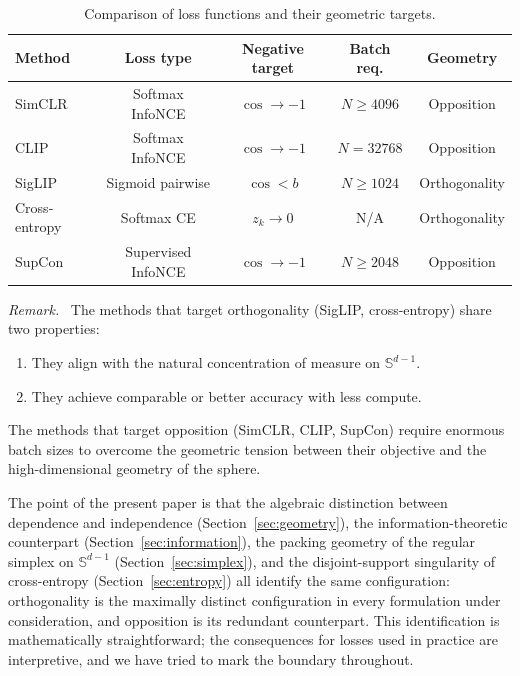 \documentclass[11pt,a4paper]{article}
\theoremstyle{remark}
\newenvironment{keyresult}{\par\medskip\noindent\textit{Remark.}\ }{\par\medskip}
\begin{document}
\begin{table}[ht]
\centering
\caption{Comparison of loss functions and their geometric targets.}
\label{tab:comparison}
\begin{tabular}{@{}lcccc@{}}
\toprule
\textbf{Method} & \textbf{Loss type} & \textbf{Negative target} & \textbf{Batch req.} & \textbf{Geometry} \\
\midrule
SimCLR~\cite{chen2020simclr} & Softmax InfoNCE & $\cos \to -1$ & $N \geq 4096$ & Opposition \\
CLIP~\cite{radford2021clip} & Softmax InfoNCE & $\cos \to -1$ & $N = 32768$ & Opposition \\
SigLIP~\cite{zhai2023siglip} & Sigmoid pairwise & $\cos < b$ & $N \geq 1024$ & Orthogonality \\
Cross-entropy & Softmax CE & $z_k \to 0$ & N/A & Orthogonality \\
SupCon~\cite{khosla2020supcon} & Supervised InfoNCE & $\cos \to -1$ & $N \geq 2048$ & Opposition \\
\bottomrule
\end{tabular}
\end{table}

\begin{keyresult}
The methods that target orthogonality (SigLIP, cross-entropy) share two properties:
\begin{enumerate}
  \item They align with the natural concentration of measure on $\mathbb{S}^{d-1}$.
  \item They achieve comparable or better accuracy with less compute.
\end{enumerate}
The methods that target opposition (SimCLR, CLIP, SupCon) require enormous batch sizes to overcome the geometric tension between their objective and the high-dimensional geometry of the sphere.
\end{keyresult}


The point of the present paper is that the algebraic distinction between dependence and independence (Section~\ref{sec:geometry}), the information-theoretic counterpart (Section~\ref{sec:information}), the packing geometry of the regular simplex on $\mathbb{S}^{d-1}$ (Section~\ref{sec:simplex}), and the disjoint-support singularity of cross-entropy (Section~\ref{sec:entropy}) all identify the same configuration: orthogonality is the maximally distinct configuration in every formulation under consideration, and opposition is its redundant counterpart.
This identification is mathematically straightforward; the consequences for losses used in practice are interpretive, and we have tried to mark the boundary throughout.
\end{document}

